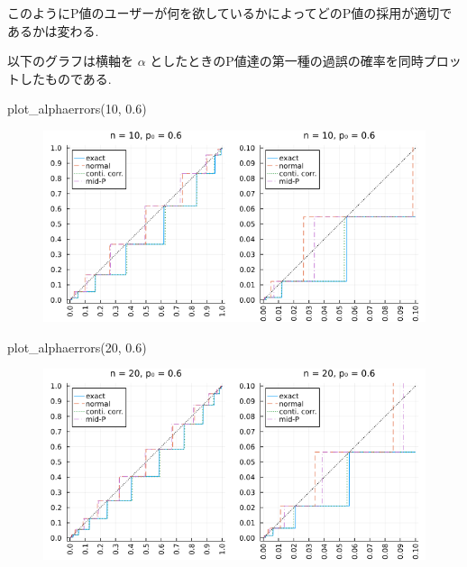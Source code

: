 \documentclass[
  letterpaper,
  DIV=11,
  numbers=noendperiod]{scrartcl}
\newenvironment{Shaded}{\begin{snugshade}}{\end{snugshade}}
\newcommand{\FloatTok}[1]{\textcolor[rgb]{0.68,0.00,0.00}{#1}}
\newcommand{\FunctionTok}[1]{\textcolor[rgb]{0.28,0.35,0.67}{#1}}
\newcommand{\NormalTok}[1]{\textcolor[rgb]{0.00,0.23,0.31}{#1}}
\begin{document}
このようにP値のユーザーが何を欲しているかによってどのP値の採用が適切であるかは変わる.

以下のグラフは横軸を \(\alpha\)
としたときのP値達の第一種の過誤の確率を同時プロットしたものである.

\begin{Shaded}
\begin{Highlighting}[]
\FunctionTok{plot\_alphaerrors}\NormalTok{(}\FloatTok{10}\NormalTok{, }\FloatTok{0.6}\NormalTok{)}
\end{Highlighting}
\end{Shaded}

\begin{figure}[H]

{\centering \includegraphics{05 Central limit theorem_files/figure-pdf/cell-63-output-1.png}

}

\end{figure}

\begin{Shaded}
\begin{Highlighting}[]
\FunctionTok{plot\_alphaerrors}\NormalTok{(}\FloatTok{20}\NormalTok{, }\FloatTok{0.6}\NormalTok{)}
\end{Highlighting}
\end{Shaded}

\begin{figure}[H]

{\centering \includegraphics{05 Central limit theorem_files/figure-pdf/cell-64-output-1.png}

}

\end{figure}
\end{document}
